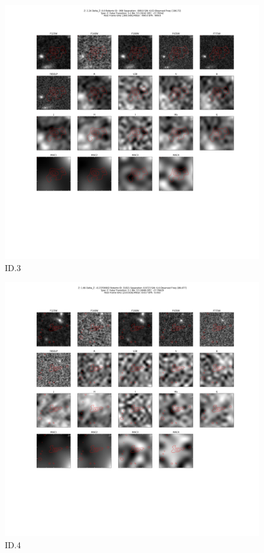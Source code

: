 \begin{figure}[tbp]
\centering \includegraphics[width=120mm]{Matched/ASPECS_Cutout_3.png}
\caption{ID.3}
\label{fig:Match_Three}
\end{figure}

\begin{figure}[tbp]
\centering \includegraphics[width=120mm]{Matched/ASPECS_Cutout_4.png}
\caption{ID.4}
\label{fig:Match_Three}
\end{figure}

